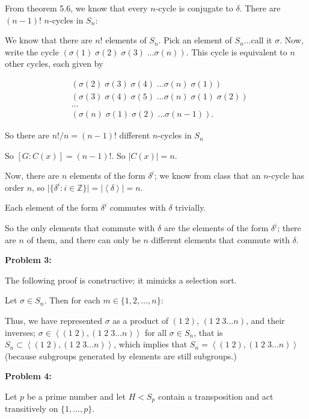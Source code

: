 \documentclass[a4paper,12pt]{article}
\newcommand{\tab}{\hspace{4mm}} %
\newcommand{\shunt}{\vspace{20mm}}
\newcommand{\absval}[1]{\lvert #1 \rvert}
\newcommand{\anbrack}[1]{\left\langle #1 \right\rangle}
\newcommand{\de}{\delta}
\newcommand{\Z}{\mathbb{Z}}
\begin{document}
From theorem 5.6, we know that every $n$-cycle is conjugate to $\de$. There are $(n-1)!$ $n$-cycles in $S_n$:

\tab We know that there are $n!$ elements of $S_n$. Pick an element of $S_n$...call it $\sigma$. Now, write the cycle $(\sigma(1) \; \sigma(2) \; \sigma(3) \; \ldots \sigma(n))$. This cycle is equivalent to $n$ other cycles, each given by

\begin{align*}
&(\sigma(2) \; \sigma(3) \; \sigma(4) \; \ldots \sigma(n) \; \sigma(1))\\
&(\sigma(3) \; \sigma(4) \; \sigma(5) \; \ldots \sigma(n) \; \sigma(1) \; \sigma(2))\\
&\ldots \\
&(\sigma(n) \; \sigma(1) \; \sigma(2) \; \ldots \sigma(n-1)).
\end{align*}

\tab So there are $n!/n = (n-1)!$ different $n$-cycles in $S_n$

So $[G:C(x)] = (n-1)!$. So $\absval{C(x)} = n$.

Now, there are $n$ elements of the form $\de^i$; we know from class that an $n$-cycle has order $n$, so $\absval{\{\de^i: i \in \Z\}}=\absval{\anbrack{\de}} = n$.

Each element of the form $\de^i$ commutes with $\de$ trivially.

So the only elements that commute with $\de$ are the elements of the form $\de^i$; there are $n$ of them, and there can only be $n$ different elements that commute with $\de$.

\shunt

{\bf Problem 3:}

The following proof is constructive; it mimicks a selection sort.

Let $\sigma \in S_n$. Then for each $m \in \{1,2, \ldots ,n\}$:

\tab %

Thus, we have represented $\sigma$ as a product of $(1 \; 2) $, $(1 \; 2 \; 3 \ldots n)$, and their inverses; $\sigma \in \anbrack{(1 \; 2) , (1 \; 2 \; 3 \ldots n)}$ for all $\sigma \in S_n$, that is $S_n \subset \anbrack{(1 \; 2) , (1 \; 2 \; 3 \ldots n)}$, which implies that $S_n = \anbrack{(1 \; 2) , (1 \; 2 \; 3 \ldots n)}$ (because subgroups generated by elements are still subgroups.)

\shunt

{\bf Problem 4:}

Let $p$ be a prime number and let $H<S_p$ contain a transposition and act transitively on $\{1,\ldots,p\}$.
\end{document}
